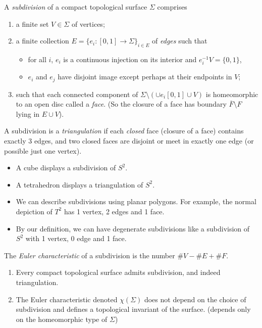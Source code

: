 \leavevmode
\begin{definition}
    A \textit{subdivision} of a compact topological surface \(\Sigma\) comprises
    \begin{enumerate}
        \item a finite set \(V \in \Sigma\) of vertices;
        \item a finite collection \(E = \{e_i: [0,1] \to \Sigma\}_{i\in E}\) of \textit{edges} such that
        \begin{itemize}
            \item for all \(i\), \(e_i\) is a continuous injection on its interior and \(e_i^{-1}V = \{0,1\}\),
            \item \(e_i\) and \(e_j\) have disjoint image except perhaps at their endpoints in \(V\);
        \end{itemize}
        \item such that each connected component of \(\Sigma \setminus (\cup e_i[0,1]\cup V)\) is homeomorphic to an open disc called a \textit{face}. (So the closure of a face has boundary \(\overline{F}\setminus F\) lying in \(E\cup V\)).
    \end{enumerate}

    A subdivision is a \textit{triangulation} if each \textit{closed} face (closure of a face) contains exactly 3 edges, and two closed faces are disjoint or meet in exactly one edge (or possible just one vertex).
\end{definition}
\begin{example}
    \leavevmode
    \begin{itemize}
        \item A cube displays a subdivision of \(S^2\).
        \item A tetrahedron displays a triangulation of \(S^2\).
        \item We can describe subdivisions using planar polygons. For example, the normal depiction of \(T^2\) has 1 vertex, 2 edges and 1 face.
        \item By our definition, we can have degenerate subdivisions like a subdivision of \(S^2\) with 1 vertex, 0 edge and 1 face.
    \end{itemize}
\end{example}
\begin{definition}
    The \textit{Euler characteristic} of a subdivision is the number \(\# V - \# E + \# F\).
\end{definition}
\begin{theorem}
    \leavevmode
    \begin{enumerate}
        \item Every compact topological surface admits subdivision, and indeed triangulation.
        \item The Euler characteristic denoted \(\chi (\Sigma)\) does not depend on the choice of subdivision and defines a topological invariant of the surface. (depends only on the homeomorphic type of \(\Sigma\))
    \end{enumerate}
\end{theorem}
